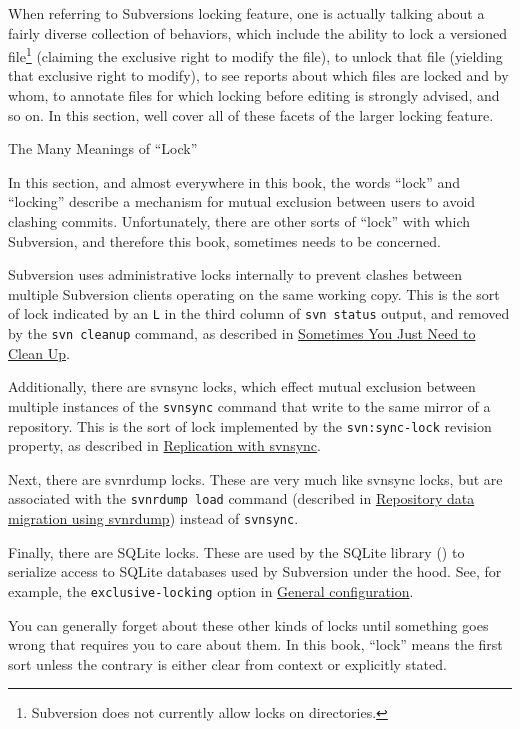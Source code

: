 When referring to Subversion\textquotesingle s locking feature, one is
actually talking about a fairly diverse collection of behaviors, which
include the ability to lock a versioned file\footnote{Subversion does
  not currently allow locks on directories.} (claiming the exclusive
right to modify the file), to unlock that file (yielding that exclusive
right to modify), to see reports about which files are locked and by
whom, to annotate files for which locking before editing is strongly
advised, and so on. In this section, we\textquotesingle ll cover all of
these facets of the larger locking feature.

\protect{}\label{svn.advanced.locking.meanings}
The Many Meanings of ``Lock''

In this section, and almost everywhere in this book, the words ``lock''
and ``locking'' describe a mechanism for mutual exclusion between users
to avoid clashing commits. Unfortunately, there are other sorts of
``lock'' with which Subversion, and therefore this book, sometimes needs
to be concerned.

Subversion uses administrative locks internally to prevent clashes
between multiple Subversion clients operating on the same working copy.
This is the sort of lock indicated by an \texttt{L} in the third column
of \texttt{svn\ status} output, and removed by the \texttt{svn\ cleanup}
command, as described in \hyperref[svn.tour.cleanup]{Sometimes You Just
Need to Clean Up}.

Additionally, there are svnsync locks, which effect mutual exclusion
between multiple instances of the \texttt{svnsync} command that write to
the same mirror of a repository. This is the sort of lock implemented by
the \texttt{svn:sync-lock} revision property, as described in
\hyperref[svn.reposadmin.maint.replication.svnsync]{Replication with
svnsync}.

Next, there are svnrdump locks. These are very much like svnsync locks,
but are associated with the \texttt{svnrdump\ load} command (described
in \hyperref[svn.reposadmin.maint.migrate.svnrdump]{Repository data
migration using svnrdump}) instead of \texttt{svnsync}.

Finally, there are SQLite locks. These are used by the SQLite library
(\href{https://www.sqlite.org/}{}) to serialize access to SQLite
databases used by Subversion under the hood. See, for example, the
\texttt{exclusive-locking} option in
\hyperref[svn.advanced.confarea.opts.config]{General configuration}.

You can generally forget about these other kinds of locks until
something goes wrong that requires you to care about them. In this book,
``lock'' means the first sort unless the contrary is either clear from
context or explicitly stated.

